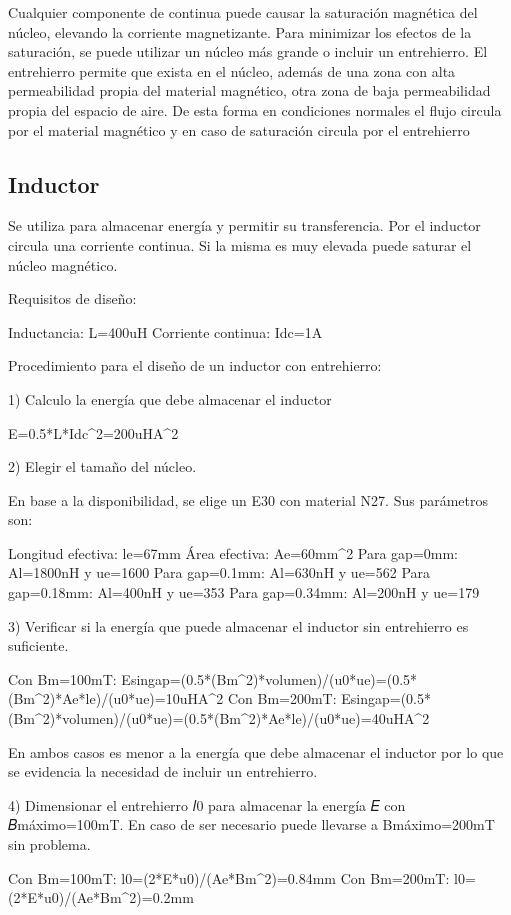 Cualquier componente de continua puede causar la saturación magnética del núcleo, 
elevando la corriente magnetizante. 
Para minimizar los efectos de la saturación, se puede utilizar un núcleo más grande o incluir un entrehierro.
El entrehierro permite que exista en el núcleo, además de una zona con alta permeabilidad propia del material magnético, 
otra zona de baja permeabilidad propia del espacio de aire. 
De esta forma en condiciones normales el flujo circula por el material magnético y en caso de saturación circula por el entrehierro 

\subsection{Inductor}

Se utiliza para almacenar energía y permitir su transferencia. 
Por el inductor circula una corriente continua. Si la misma es muy elevada puede saturar el núcleo magnético. 

Requisitos de diseño: 

Inductancia: L=400uH
Corriente continua: Idc=1A

Procedimiento para el diseño de un inductor con entrehierro:

1) Calculo la energía que debe almacenar el inductor

E=0.5*L*Idc^2=200uHA^2

2) Elegir el tamaño del núcleo.

En base a la disponibilidad, se elige un E30 con material N27. 
Sus parámetros son:

Longitud efectiva: le=67mm
Área efectiva: Ae=60mm^2
Para gap=0mm:
Al=1800nH y ue=1600
Para gap=0.1mm:
Al=630nH y ue=562
Para gap=0.18mm:
Al=400nH y ue=353
Para gap=0.34mm:
Al=200nH y ue=179

3) Verificar si la energía que puede almacenar el inductor sin entrehierro es suficiente. 

Con Bm=100mT:
Esingap=(0.5*(Bm^2)*volumen)/(u0*ue)=(0.5*(Bm^2)*Ae*le)/(u0*ue)=10uHA^2
Con Bm=200mT:
Esingap=(0.5*(Bm^2)*volumen)/(u0*ue)=(0.5*(Bm^2)*Ae*le)/(u0*ue)=40uHA^2

En ambos casos es menor a la energía que debe almacenar el inductor por lo que se evidencia la necesidad de incluir un entrehierro. 

4) Dimensionar el entrehierro 𝑙0 para almacenar la energía 𝐸 con 𝐵máximo=100mT.
En caso de ser necesario puede llevarse a Bmáximo=200mT sin problema. 

Con Bm=100mT:
l0=(2*E*u0)/(Ae*Bm^2)=0.84mm
Con Bm=200mT:
l0=(2*E*u0)/(Ae*Bm^2)=0.2mm


